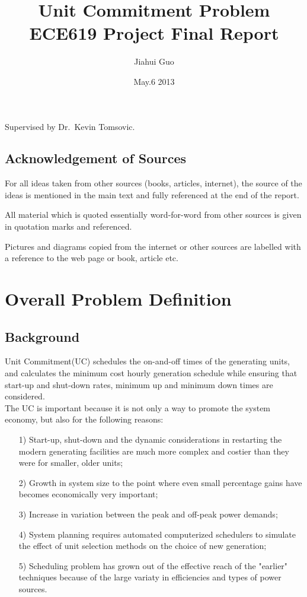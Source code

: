 \documentclass[a4paper, 12pt, notitlepage]{report}
\title{\textbf{Unit Commitment Problem}\\[2em]ECE619 Project Final Report}
\author{Jiahui Guo}
\date{May.6 2013}
\begin{document}
\maketitle
\begin{center}
Supervised by Dr.\ Kevin Tomsovic.
\end{center}
\thispagestyle{empty}
\newpage
\section*{Acknowledgement of Sources}
For all ideas taken from other sources (books, articles, internet), the source of the ideas is mentioned in the main text and fully referenced at the end of the report.

All material which is quoted essentially word-for-word from other sources is given in quotation marks and referenced.

Pictures and diagrams copied from the internet or other sources are labelled with a reference to the web page or book, article etc.

\tableofcontents


\chapter{Overall Problem Definition}
%


\section{Background}
%
Unit Commitment(UC) schedules the on-and-off times of the generating units, and calculates the minimum cost hourly generation schedule while ensuring that start-up and shut-down rates, minimum up and minimum down times are considered.\\
The UC is important because it is not only a way to promote the system economy, but also for the following reasons:\cite{1}
\begin{enumerate}
\item[1)]Start-up, shut-down and the dynamic considerations in restarting the modern generating facilities are much more complex and costier than they were for smaller, older units;
\item[2)]Growth in system size to the point where even small percentage gains have becomes economically very important;
\item[3)]Increase in variation between the peak and off-peak power demands;
\item[4)]System planning requires automated computerized schedulers to simulate the effect of unit selection methods on the choice of new generation;
\item[5)]Scheduling problem has grown out of the effective reach of the "earlier" techniques because of the large variaty in efficiencies and types of power sources.
\end{enumerate}
\end{document}
